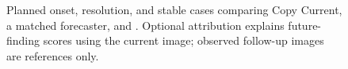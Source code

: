 \begin{figure}[tbp]
    \centering
    \caption{Planned onset, resolution, and stable cases comparing Copy Current, a matched forecaster, and \method{}. Optional attribution explains future-finding scores using the current image; observed follow-up images are references only.}
    \label{fig:candidate_longitudinal_forecasting}
\end{figure}
